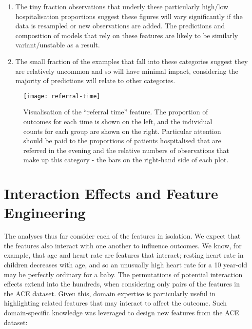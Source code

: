 \begin{enumerate}
    \item The tiny fraction observations that underly these particularly high/low hospitalisation proportions suggest these figures will vary significantly if the data is resampled or new observations are added. The predictions and composition of models that rely on these features are likely to be similarly variant/unstable as a result.
    \item The small fraction of the examples that fall into these categories suggest they are relatively uncommon and so will have minimal impact, considering the majority of predictions will relate to other categories.
\end{enumerate}

\begin{figure}[H]
    \centering
    \texttt{[image: referral-time]}
    \caption[Visualisation of the ``referral time'' feature]{Visualisation of the ``referral time'' feature. The proportion of outcomes for each time is shown on the left, and the individual counts for each group are shown on the right. Particular attention should be paid to the proportions of patients hospitalised that are referred in the evening and the relative numbers of observations that make up this category - the bars on the right-hand side of each plot.}
    \label{fig:referral-time}
\end{figure}

\section{Interaction Effects and Feature Engineering}\label{sec:interaction-effects-and-feature-engineering}

The analyses thus far consider each of the features in isolation. We expect that the features also interact with one another to influence outcomes. We know, for example, that age and heart rate are features that interact; resting heart rate in children decreases with age, and so an unusually high heart rate for a 10 year-old may be perfectly ordinary for a baby. The permutations of potential interaction effects extend into the hundreds, when considering only pairs of the features in the ACE dataset. Given this, domain expertise is particularly useful in highlighting related features that may interact to affect the outcome. Such domain-specific knowledge was leveraged to design new features from the ACE dataset:


